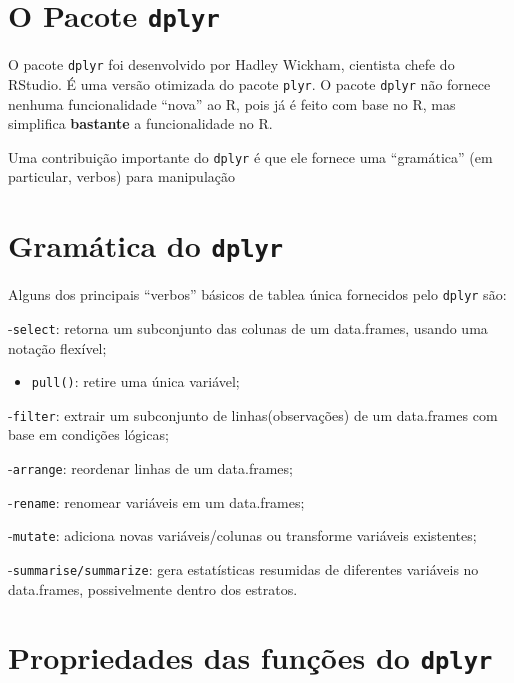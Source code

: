 \documentclass[]{book}
\providecommand{\tightlist}{%
  \setlength{\itemsep}{0pt}\setlength{\parskip}{0pt}}
\begin{document}
\hypertarget{o-pacote-dplyr}{%
\section{\texorpdfstring{O Pacote \texttt{dplyr}}{O Pacote dplyr}}\label{o-pacote-dplyr}}

O pacote \texttt{dplyr} foi desenvolvido por Hadley Wickham, cientista chefe do RStudio. É uma versão otimizada do pacote \texttt{plyr}. O pacote \texttt{dplyr} não fornece nenhuma funcionalidade ``nova'' ao R, pois já é feito com base no R, mas simplifica \textbf{bastante} a funcionalidade no R.

Uma contribuição importante do \texttt{dplyr} é que ele fornece uma ``gramática'' (em particular, verbos) para manipulação

\hypertarget{gramuxe1tica-do-dplyr}{%
\section{\texorpdfstring{Gramática do \texttt{dplyr}}{Gramática do dplyr}}\label{gramuxe1tica-do-dplyr}}

Alguns dos principais ``verbos'' básicos de tablea única fornecidos pelo \texttt{dplyr} são:

-\texttt{select}: retorna um subconjunto das colunas de um data.frames, usando uma notação flexível;

\begin{itemize}
\tightlist
\item
  \texttt{pull()}: retire uma única variável;
\end{itemize}

-\texttt{filter}: extrair um subconjunto de linhas(observações) de um data.frames com base em condições lógicas;

-\texttt{arrange}: reordenar linhas de um data.frames;

-\texttt{rename}: renomear variáveis em um data.frames;

-\texttt{mutate}: adiciona novas variáveis/colunas ou transforme variáveis existentes;

-\texttt{summarise/summarize}: gera estatísticas resumidas de diferentes variáveis no data.frames, possivelmente dentro dos estratos.

\hypertarget{propriedades-das-funuxe7uxf5es-do-dplyr}{%
\section{\texorpdfstring{Propriedades das funções do \texttt{dplyr}}{Propriedades das funções do dplyr}}\label{propriedades-das-funuxe7uxf5es-do-dplyr}}
\end{document}
